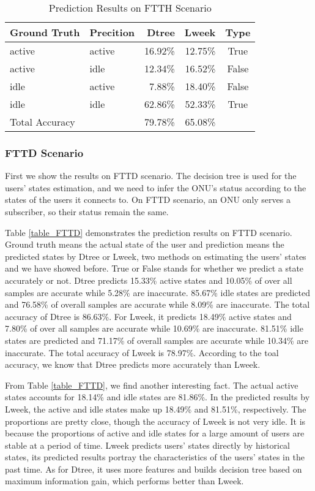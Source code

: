 \documentclass[journal]{IEEEtran}
\begin{document}
\begin{table}[H]
\centering
\caption{Prediction Results on FTTH Scenario}
\label{table_FTTH}
\begin{tabular}{llrrc}
  \toprule
Ground Truth & Precition & Dtree & Lweek & Type\\  
  \midrule
active & active & 16.92\% & 12.75\% & True\\  
active & idle & 12.34\% & 16.52\% & False\\ 
idle & active & 7.88\% & 18.40\% & False\\
idle & idle & 62.86\% & 52.33\% & True\\ 
  \midrule
\qquad \qquad Total Accuracy &  & 79.78\% & 65.08\%\\ 
  \bottomrule
\end{tabular}  
\end{table}

\subsubsection{FTTD Scenario} First we show the results on FTTD scenario. The decision tree is used for the users' states estimation, and we need to infer the ONU's status according to the states of the users it connects to. On FTTD scenario, an ONU only serves a subscriber, so their status remain the same.

Table \ref{table_FTTD} demonstrates the prediction results on FTTD scenario. Ground truth means the actual state of the user and prediction means the predicted states by Dtree or Lweek, two methods on estimating the users' states and we have showed before. True or False stands for whether we predict a state accurately or not. Dtree predicts 15.33\% active states and 10.05\% of over all samples are accurate while 5.28\% are inaccurate. 85.67\% idle states are predicted and 76.58\% of overall samples are accurate while 8.09\% are inaccurate. The total accuracy of Dtree is 86.63\%. For Lweek, it predicts 18.49\% active states and 7.80\% of over all samples are accurate while 10.69\% are inaccurate. 81.51\% idle states are predicted and 71.17\% of overall samples are accurate while 10.34\% are inaccurate. The total accuracy of Lweek is 78.97\%. According to the toal accuracy, we know that Dtree predicts more accurately than Lweek.

From Table \ref{table_FTTD}, we find another interesting fact. The actual active states accounts for 18.14\% and idle states are 81.86\%. In the predicted results by Lweek, the active and idle states make up 18.49\% and 81.51\%, respectively. The proportions are pretty close, though the accuracy of Lweek is not very idle. It is because the proportions of active and idle states for a large amount of users are stable at a period of time. Lweek predicts users' states directly by historical states, its predicted results portray the characteristics of the users' states in the past time. As for Dtree, it uses more features and builds decision tree based on maximum information gain, which performs better than Lweek.
\end{document}
